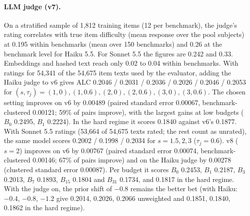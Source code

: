 \documentclass{article}
\begin{document}
\paragraph{LLM judge (v7).} On a stratified sample of 1,812 training items (12 per benchmark),
the judge's rating correlates with true item difficulty (mean response over the pool subjects) at
0.195 within benchmarks (mean over 150 benchmarks) and 0.26 at the benchmark level for Haiku 5.5. For
Sonnet 5.5 the figures are 0.242 and 0.33. Embeddings and hashed text reach only 0.02 to 0.04 within
benchmarks. With ratings for 54,341 of the 54,675 item texts used by the evaluator, adding the Haiku
judge to v6 gives ALC 0.2046 / 0.2031 / 0.2036 / 0.2026 / 0.2046 / 0.2053 for
$(s,\tau_j)=(1,0),(1,0.6),(2,0),(2,0.6),(3,0),(3,0.6)$. The chosen setting improves on v6 by 0.00489
(paired standard error 0.00067, benchmark-clustered 0.00121; 59\% of pairs improve), with the largest
gains at low budgets ($B_0$ 0.2495, $B_1$ 0.2224). In the hard regime it scores 0.1840 against v6's
0.1877.
With Sonnet 5.5 ratings (53,664 of 54,675 texts rated; the rest count as unrated), the same model
scores 0.2002 / 0.1998 / 0.2034 for $s=1.5, 2, 3$ ($\tau_j=0.6$). v8 ($s=2$) improves on v6 by 0.00767
(paired standard error 0.00074, benchmark-clustered 0.00146; 67\% of pairs improve) and on the
Haiku judge by 0.00278 (clustered standard error 0.00087). Per budget it scores $B_0$ 0.2453, $B_1$
0.2187, $B_3$ 0.2013, $B_7$ 0.1893, $B_{15}$ 0.1804 and $B_{31}$ 0.1734, and 0.1817 in the hard
regime. With the judge on, the prior shift of $-0.8$ remains the better bet (with Haiku: $-0.4$,
$-0.8$, $-1.2$ give 0.2014, 0.2026, 0.2066 unweighted and 0.1851, 0.1840, 0.1862 in the hard
regime).
\end{document}
